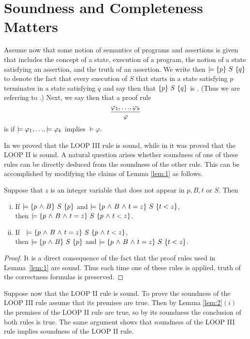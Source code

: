 \documentclass[runningheads]{llncs}       %
\begin{document}
\section{Soundness and Completeness Matters}

Assume now that some notion of semantics of programs and assertions is given 
that includes the concept of a state, execution of a program,
the notion of a state satisfying an assertion, and the truth of an assertion.
We write then $\models \mbox{$\{{p}\}\ {S}\ \{{q}\}$}$ to denote the fact that every execution of $S$ 
that starts in a state satisfying $p$ terminates in a state satisfying $q$ 
and say then that $\mbox{$\{{p}\}\ {S}\ \{{q}\}$}$ is .
(Thus we are referring to .)
Next, we say then that a proof rule
\[
  \frac{\varphi_1,\mbox{$\ldots$},\varphi_k}{\varphi}
\]
is  if
$\models \varphi_1,\mbox{$\ldots$}, \models \varphi_k$ implies $\models \varphi$.

In \cite{ABO09} we proved that the LOOP III rule is sound, while in \cite{Rey98} 
it was proved that the LOOP II is sound. A natural question arises 
whether soundness of one of these rules can be directly deduced from
the soundness of the other rule. 
This can be accomplished by  modifying the claims of Lemma \ref{lem:1} as follows.

\begin{lemma} \label{lem:2}
Suppose that $z$ is an integer variable that
does not appear in $p,B,t$ or $S$.
Then
  \begin{enumerate} [(i)]
  \item 
    If $\models \mbox{$\{{p \mbox{$\ \wedge\ $} B}\}\ {S}\ \{{p}\}$}$ and $\models \mbox{$\{{p \mbox{$\ \wedge\ $} B \mbox{$\ \wedge\ $} t=z}\}\ {S}\ \{{t<z}\}$}$, \\ 
    then $\models \mbox{$\{{p \mbox{$\ \wedge\ $} B \mbox{$\ \wedge\ $} t=z}\}\ {S}\ \{{p \mbox{$\ \wedge\ $} t<z}\}$}$.
    
  \item
    If \ $\models \mbox{$\{{p \mbox{$\ \wedge\ $} B \mbox{$\ \wedge\ $} t=z}\}\ {S}\ \{{p \mbox{$\ \wedge\ $} t<z}\}$}$, \\ 
    then $\models \mbox{$\{{p \mbox{$\ \wedge\ $} B}\}\ {S}\ \{{p}\}$}$ and $\models \mbox{$\{{p \mbox{$\ \wedge\ $} B \mbox{$\ \wedge\ $} t=z}\}\ {S}\ \{{t<z}\}$}$.

  \end{enumerate}
\end{lemma}

\begin{proof}
  It is a direct consequence of the fact that the proof rules used 
  in Lemma~\ref{lem:1} are sound. Thus each time one of these rules
  is applied, truth of the correctness formulas is preserved. 
  \HB
\end{proof}

Suppose now that the LOOP II rule is sound. To prove the soundness 
of the LOOP III rule assume that its premises are true. 
Then by Lemma \ref{lem:2}$(i)$ the premises of the LOOP II rule are true, 
so by its soundness the conclusion of both rules is true.
The same argument shows that soundness of the LOOP III rule 
implies soundness of the LOOP II rule.
\end{document}
